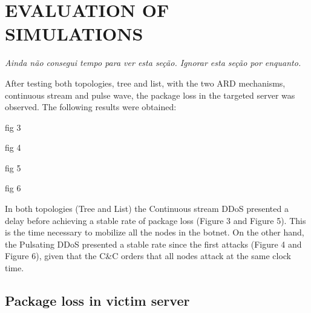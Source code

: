 \documentclass[a4paper,twoside]{article}
\begin{document}

\section{\uppercase{Evaluation of simulations}} \label{sec:evaluation}

\emph{Ainda não consegui tempo para ver esta seção. Ignorar esta seção por enquanto.}

After testing both topologies, tree and list, with the two ARD mechanisms, continuous stream and pulse wave, the package loss in the targeted server was observed. The following results were obtained:

fig 3

fig 4

fig 5

fig 6

In both topologies (Tree and List) the Continuous stream DDoS presented a delay before achieving a stable rate of package loss (Figure 3 and Figure 5). This is the time necessary to mobilize all the nodes in the botnet.
On the other hand, the Pulsating DDoS presented a stable rate since the first attacks (Figure 4 and Figure 6), given that the C\&C orders that all nodes attack at the same clock time.

\subsection{Package loss in victim server}
\end{document}
